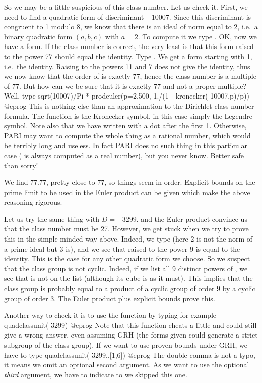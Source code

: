 So we may be a little suspicious of this class number. Let us check it.
First, we need to find a quadratic form of discriminant $-10007$. Since this
discriminant is congruent to 1 modulo 8, we know that there is an ideal of
norm equal to 2, i.e.~a binary quadratic form $(a,b,c)$ with $a=2$. To
compute it we type . OK, now we have a form.
If the class number is correct, the very least is that this form raised to
the power 77 should equal the identity. Type . We get a form
starting with 1, i.e.~the identity. Raising  to the powers 11 and 7
does not give the identity, thus we now know that the order of  is
exactly 77, hence the class number is a multiple of 77. But how can we be
sure that it is exactly 77 and not a proper multiple? Well, type
\bprog
  sqrt(10007)/Pi * prodeuler(p=2,500, 1./(1 - kronecker(-10007,p)/p))
@eprog\noindent
This is nothing else than an approximation to the Dirichlet class number
formula. The function  is the Kronecker symbol, in this case
simply the Legendre symbol. Note also that we have written 
with a dot after the first 1. Otherwise, PARI may want to compute the whole
thing as a rational number, which would be terribly long and useless. In fact
PARI does no such thing in this particular case ( is always
computed as a real number), but you never know. Better safe than sorry!

We find 77.77, pretty close to 77, so things seem in order. Explicit bounds
on the prime limit to be used in the Euler product can be given which make
the above reasoning rigorous.

Let us try the same thing with $D=-3299$.  and the Euler
product convince us that the class number must be 27. However, we get stuck
when we try to prove this in the simple-minded way above. Indeed, we type
 (here 2 is not the norm of a prime ideal but
3 is), and we see that  raised to the power 9 is equal to the identity.
This is the case for any other quadratic form we choose. So we suspect that the
class group is not cyclic. Indeed, if we list all 9 distinct powers of ,
we see that  is not on the list (although its cube
is as it must). This implies that the class group is probably equal to a
product of a cyclic group of order 9 by a cyclic group of order 3. The Euler
product plus explicit bounds prove this.

Another way to check it is to use the  function by typing
for example
\bprog
  quadclassunit(-3299)
@eprog\noindent
Note that this function cheats a little and could still give a wrong answer,
even assuming GRH (the forms given could generate a strict subgroup of the
class group). If we want to use proven bounds under GRH, we have to type
\bprog
  quadclassunit(-3299,,[1,6])
@eprog\noindent
The double comma \kbd{,,} is not a typo, it means we omit an optional second
argument. As we want to use the optional \emph{third} argument, we have to
indicate to  we skipped this one.

